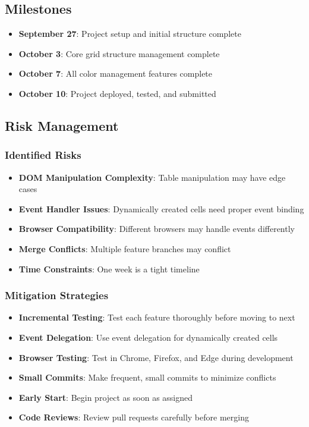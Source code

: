 \documentclass[11pt,a4paper]{article}
\begin{document}
\subsection{Milestones}

\begin{itemize}[leftmargin=*]
    \item \textbf{September 27}: Project setup and initial structure complete
    \item \textbf{October 3}: Core grid structure management complete
    \item \textbf{October 7}: All color management features complete
    \item \textbf{October 10}: Project deployed, tested, and submitted
\end{itemize}

\subsection{Risk Management}

\subsubsection{Identified Risks}
\begin{itemize}[leftmargin=*]
    \item \textbf{DOM Manipulation Complexity}: Table manipulation may have edge cases
    \item \textbf{Event Handler Issues}: Dynamically created cells need proper event binding
    \item \textbf{Browser Compatibility}: Different browsers may handle events differently
    \item \textbf{Merge Conflicts}: Multiple feature branches may conflict
    \item \textbf{Time Constraints}: One week is a tight timeline
\end{itemize}

\subsubsection{Mitigation Strategies}
\begin{itemize}[leftmargin=*]
    \item \textbf{Incremental Testing}: Test each feature thoroughly before moving to next
    \item \textbf{Event Delegation}: Use event delegation for dynamically created cells
    \item \textbf{Browser Testing}: Test in Chrome, Firefox, and Edge during development
    \item \textbf{Small Commits}: Make frequent, small commits to minimize conflicts
    \item \textbf{Early Start}: Begin project as soon as assigned
    \item \textbf{Code Reviews}: Review pull requests carefully before merging
\end{itemize}
\end{document}
